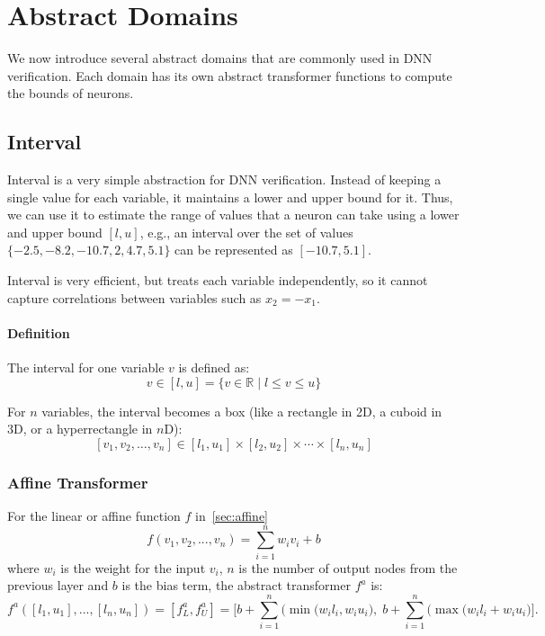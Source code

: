 \documentclass[oneside,11pt,dvipsnames]{book}
\numberwithin{equation}{section}
\theoremstyle{definition}
\theoremstyle{remark}
\begin{document}
\section{Abstract Domains}\label{sec:abstract-domains}

We now introduce several abstract domains that are commonly used in DNN verification. Each domain has its own abstract transformer functions to compute the bounds of neurons.

\subsection{Interval}\label{sec:interval-abstraction}

Interval is a very simple abstraction for DNN verification. 
Instead of keeping a single value for each variable, it maintains a lower and upper bound for it. 
Thus, we can use it to estimate the range of values that a neuron can take using a lower and upper bound $[l, u]$, e.g., an interval over the set of values $\{-2.5, -8.2, -10.7, 2, 4.7, 5.1\}$ can be represented as $[-10.7, 5.1]$.

Interval is very efficient, but treats each variable independently, so it cannot capture correlations between variables such as $x_2 = -x_1$.

\paragraph{Definition}
The interval for one variable \(v\) is defined as:
\[
v \in [l, u] = \{v \in \mathbb{R} \mid l \le v \le u\}
\]


For $n$ variables, the interval becomes a box (like a rectangle in 2D, a cuboid in 3D, or a hyperrectangle in $n$D):
\[
[v_1, v_2, \ldots, v_n] \in [l_1, u_1] \times [l_2, u_2] \times \cdots \times [l_n, u_n]
\]


\subsubsection{Affine Transformer}

For the linear or affine function \(f\) in~\autoref{sec:affine}
\[f(v_1, v_2, ...,v_n) = \sum_{i=1}^{n} w_i v_i + b\]
where $w_i$ is the weight for the input \(v_i\), $n$ is the number of output nodes from the previous layer and \(b\) is the bias term, the abstract transformer \(f^a\) is:
\[
f^{a}([l_1, u_1],..., [l_n, u_n]) = [f^a_L, f^a_U] = 
\Bigg[b + \sum_{i=1}^{n}\big(\min(w_il_i, w_iu_i\big),\; b+ \sum_{i=1}^{n}\big(\max(w_il_i + w_iu_i\big)\Bigg].
\]
\end{document}
